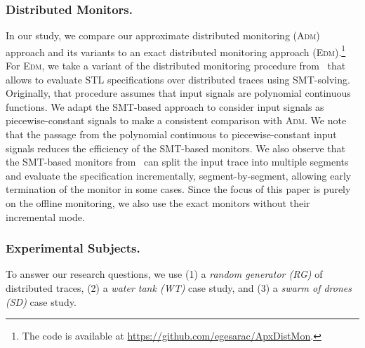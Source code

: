 \subsubsection{Distributed Monitors.}
In our study, we compare our approximate distributed monitoring (\textsc{Adm}) approach and its variants to an exact distributed monitoring approach (\textsc{Edm}).\footnote[1]{The code is available at \url{https://github.com/egesarac/ApxDistMon}.}
For \textsc{Edm}, we take a variant of the distributed monitoring procedure from~\cite{MomtazAB23} that allows to evaluate STL specifications over distributed traces using SMT-solving.
Originally, that procedure assumes that input signals are polynomial continuous functions.
We adapt the SMT-based approach to consider input signals as piecewise-constant signals to make a consistent comparison with \textsc{Adm}.
We note that the passage from the polynomial continuous to piecewise-constant input signals reduces the efficiency of the SMT-based monitors.
We also observe that the SMT-based monitors from~\cite{MomtazAB23} can split the input trace into multiple segments and evaluate the specification incrementally, segment-by-segment, allowing early termination of the monitor in some cases.
Since the focus of this paper is purely on the offline monitoring, we also use the exact monitors without their incremental mode.


\subsubsection{Experimental Subjects.}
To answer our research questions, we use (1) a \emph{random generator (RG)} of distributed traces, (2) a \emph{water tank (WT)} case study, and (3) a \emph{swarm of drones (SD)} case study.  

